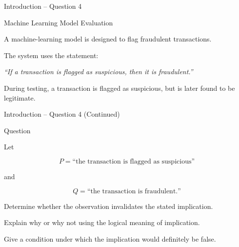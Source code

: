 
\begin{frame}{Introduction -- Question 4}

\begin{block}{Machine Learning Model Evaluation}

A machine-learning model is designed to flag fraudulent transactions.

The system uses the statement:

\begin{center}
\textit{``If a transaction is flagged as suspicious, then it is fraudulent.''}
\end{center}

During testing, a transaction is flagged as suspicious, but is later found
to be legitimate.

\end{block}

\end{frame}


\begin{frame}{Introduction -- Question 4 (Continued)}

\begin{block}{Question}

Let

\[
P=\text{``the transaction is flagged as suspicious''}
\]

and

\[
Q=\text{``the transaction is fraudulent.''}
\]

\medskip

Determine whether the observation invalidates the stated implication.

Explain why or why not using the logical meaning of implication.

Give a condition under which the implication would definitely be false.

\end{block}

\end{frame}


